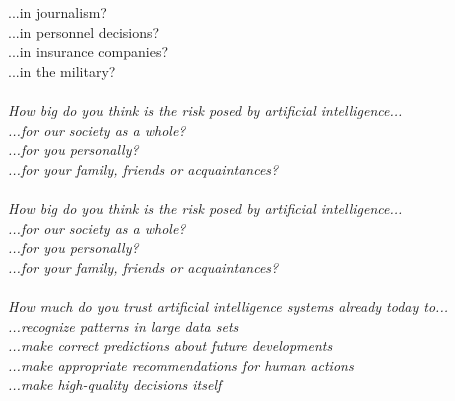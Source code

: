 \documentclass{article}
\begin{document}
\begin{table}[H]
\begin{tabu}
\hspace{1em}...in journalism?\\
\hspace{1em}...in personnel decisions?\\
\hspace{1em}...in insurance companies?\\
\hspace{1em}...in the military?\\
\addlinespace[0.3em]
\\
\em{\hspace{1em}How big do you think is the risk posed by artificial \vphantom{1}intelligence...}\\
\hspace{1em}...for our society as a \vphantom{1}whole?\\
\hspace{1em}...for you \vphantom{1}personally?\\
\hspace{1em}...for your family, friends or \vphantom{1}acquaintances?\\
\addlinespace[0.3em]
\\
\em{\hspace{1em}How big do you think is the risk posed by artificial intelligence...}\\
\hspace{1em}...for our society as a whole?\\
\hspace{1em}...for you personally?\\
\hspace{1em}...for your family, friends or acquaintances?\\
\addlinespace[0.3em]
\\
\em{\hspace{1em}How much do you trust artificial intelligence systems already today to...}\\
\hspace{1em}...recognize patterns in large data sets\\
\hspace{1em}...make correct predictions about future developments\\
\hspace{1em}...make appropriate recommendations for human actions\\
\hspace{1em}...make high-quality decisions itself\\
\bottomrule
\end{tabu}
\end{table}



\end{document}
